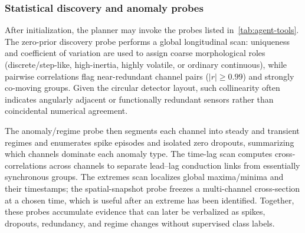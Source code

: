 \subsubsection{Statistical discovery and anomaly probes}
After initialization, the planner may invoke the probes listed in~\cref{tab:agent-tools}.
The zero-prior discovery probe performs a global longitudinal scan: uniqueness and coefficient of
variation are used to assign coarse morphological roles (discrete/step-like, high-inertia, highly
volatile, or ordinary continuous), while pairwise correlations flag near-redundant channel pairs
($|r|\ge 0.99$) and strongly co-moving groups.
Given the circular detector layout, such collinearity often indicates angularly adjacent or
functionally redundant sensors rather than coincidental numerical agreement.

The anomaly/regime probe then segments each channel into steady and transient regimes and enumerates
spike episodes and isolated zero dropouts, summarizing which channels dominate each anomaly type.
The time-lag scan computes cross-correlations across channels to separate lead--lag conduction links
from essentially synchronous groups.
The extremes scan localizes global maxima/minima and their timestamps; the spatial-snapshot probe
freezes a multi-channel cross-section at a chosen time, which is useful after an extreme has been
identified.
Together, these probes accumulate evidence that can later be verbalized as spikes, dropouts,
redundancy, and regime changes without supervised class labels.

